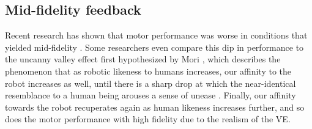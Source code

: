 \documentclass[conference]{IEEEtran}
\begin{document}
\subsection{Mid-fidelity feedback}
Recent research has shown that motor performance was worse in conditions that yielded mid-fidelity \cite{MahdiNabiyouni201520153DUI.}.
Some researchers even compare this dip in performance to the uncanny valley effect first hypothesized by Mori \cite{Mori2012TheValley}, which describes the phenomenon that as robotic likeness to humans increases, our affinity to the robot increases as well, until there is a sharp drop at which the near-identical resemblance to a human being arouses a sense of unease \cite{Bhargava2018EvaluatingSimulations}. Finally, our affinity towards the robot recuperates again as human likeness increases further, and so does the motor performance with high fidelity due to the realism of the VE. 
\end{document}
